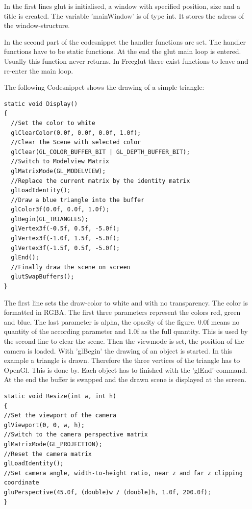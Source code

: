 \documentclass[10pt,a4paper,DIV=11]{scrreprt}
\begin{document}
In the first lines glut is initialised, a window with specified position, size and a title is created.
The variable 'mainWindow' is of type int. It stores the adress of the window-structure.

In the second part of the codesnippet the handler functions are set. The handler functions have to be static functions.
At the end the glut main loop is entered. Usually this function never returns. In Freeglut there exist functions to leave and re-enter the main loop.

The following Codesnippet shows the drawing of a simple triangle:

\begin{lstlisting}[caption={Drawing some graphics},label=lst:glut-draw]
static void Display()
{
  //Set the color to white
  glClearColor(0.0f, 0.0f, 0.0f, 1.0f);
  //Clear the Scene with selected color
  glClear(GL_COLOR_BUFFER_BIT | GL_DEPTH_BUFFER_BIT);
  //Switch to Modelview Matrix
  glMatrixMode(GL_MODELVIEW);
  //Replace the current matrix by the identity matrix
  glLoadIdentity();
  //Draw a blue triangle into the buffer
  glColor3f(0.0f, 0.0f, 1.0f);
  glBegin(GL_TRIANGLES);
  glVertex3f(-0.5f, 0.5f, -5.0f);
  glVertex3f(-1.0f, 1.5f, -5.0f);
  glVertex3f(-1.5f, 0.5f, -5.0f);
  glEnd();
  //Finally draw the scene on screen
  glutSwapBuffers();
}
\end{lstlisting}

The first line sets the draw-color to white and with no transparency. The color is formatted in RGBA. The first three parameters represent the colors red, green and blue. The last parameter is alpha, the opacity of the figure. 0.0f means no quantity of the according parameter and 1.0f as the full quantity.
 This is used by the second line to clear the scene.
Then the viewmode is set, the position of the camera is loaded.
With 'glBegin' the drawing of an object is started. In this example a triangle is drawn. Therefore the three vertices of the triangle has to OpenGl. This is done by. Each object has to finished with the 'glEnd'-command.
At the end the buffer is swapped and the drawn scene is displayed at the screen.

\begin{lstlisting}[caption={Resize camera perspective on window resize},label=lst:glut-resize]
static void Resize(int w, int h)
{
//Set the viewport of the camera
glViewport(0, 0, w, h);
//Switch to the camera perspective matrix
glMatrixMode(GL_PROJECTION); 
//Reset the camera matrix
glLoadIdentity();
//Set camera angle, width-to-height ratio, near z and far z clipping coordinate
gluPerspective(45.0f, (double)w / (double)h, 1.0f, 200.0f);
}
\end{lstlisting}
\end{document}
